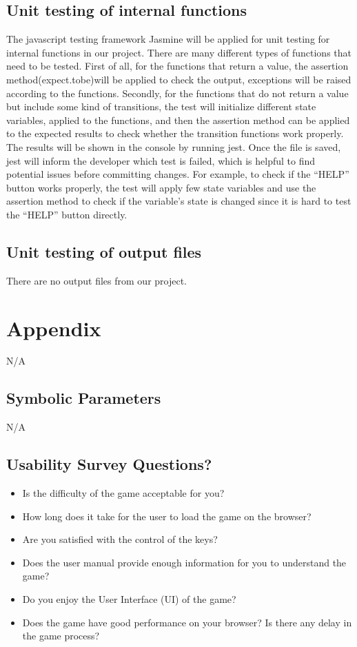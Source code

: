 \documentclass[12pt, titlepage]{article}
\begin{document}
\subsection{Unit testing of internal functions}
The javascript testing framework Jasmine will be applied for unit testing for internal functions in our project. There are many different types of functions that need to be tested. First of all, for the functions that return a value, the assertion method(expect.tobe)will be applied to check the output, exceptions will be raised according to the functions. Secondly, for the functions that do not return a value but include some kind of transitions,  the test will initialize different state variables, applied to the functions, and then the assertion method can be applied to the expected results to check whether the transition functions work properly. The results will be shown in the console by running jest. Once the file is saved, jest will inform the developer which test is failed, which is helpful to find potential issues before committing changes. For example, to check if the “HELP” button works properly, the test will apply few state variables and use the assertion method to check if the variable’s state is changed since it is hard to test the “HELP” button directly.

\subsection{Unit testing of output files}		
There are no output files from our project.





\newpage

\section{Appendix}

N/A

\subsection{Symbolic Parameters}

N/A

\subsection{Usability Survey Questions?}
\begin{itemize}
  	\item Is the difficulty of the game acceptable for you?
	\item How long does it take for the user to load the game on the browser?
	\item Are you satisfied with the control of the keys?
	\item Does the user manual provide enough information for you to understand the game? 
	\item Do you enjoy the User Interface (UI) of the game?
	\item Does the game have good performance on your browser? Is there any delay in the game process?
\end{itemize}
\end{document}
